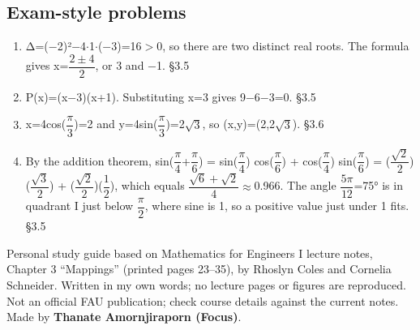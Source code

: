 \documentclass[11pt]{article}
\begin{document}
\begin{keepsection}\subsection{Exam-style problems}

\begin{enumerate}
\item Δ=(\ensuremath{-}2)²\ensuremath{-}4\ensuremath{\cdot}1\ensuremath{\cdot}(\ensuremath{-}3)=16\ensuremath{>}0, so there are two distinct real roots. The formula gives x={\small\ensuremath{\dfrac{2\pm 4}{2}}}, or 3 and \ensuremath{-}1. \hfill{\small\color{FAUblue}§3.5}
\item P(x)=(x\ensuremath{-}3)(x+1). Substituting x=3 gives 9\ensuremath{-}6\ensuremath{-}3=0. \hfill{\small\color{FAUblue}§3.5}
\item x=4cos({\small\ensuremath{\dfrac{π}{3}}})=2 and y=4sin({\small\ensuremath{\dfrac{π}{3}}})=2\ensuremath{\sqrt{3}}, so (x,y)=(2,2\ensuremath{\sqrt{3}}). \hfill{\small\color{FAUblue}§3.6}
\item By the addition theorem, sin({\small\ensuremath{\dfrac{π}{4}}}+{\small\ensuremath{\dfrac{π}{6}}}) = sin({\small\ensuremath{\dfrac{π}{4}}}) cos({\small\ensuremath{\dfrac{π}{6}}}) + cos({\small\ensuremath{\dfrac{π}{4}}}) sin({\small\ensuremath{\dfrac{π}{6}}}) = ({\small\ensuremath{\dfrac{\sqrt{2}}{2}}})({\small\ensuremath{\dfrac{\sqrt{3}}{2}}}) + ({\small\ensuremath{\dfrac{\sqrt{2}}{2}}})({\small\ensuremath{\dfrac{1}{2}}}), which equals {\small\ensuremath{\dfrac{\sqrt{6}+\sqrt{2}}{4}}}\ensuremath{\approx}0.966. The angle {\small\ensuremath{\dfrac{5π}{12}}}=75° is in quadrant I just below {\small\ensuremath{\dfrac{π}{2}}}, where sine is 1, so a positive value just under 1 fits. \hfill{\small\color{FAUblue}§3.5}
\end{enumerate}

\end{keepsection}

\vfill{\small Personal study guide based on Mathematics for Engineers I lecture notes, Chapter 3 “Mappings” (printed pages 23–35), by Rhoslyn Coles and Cornelia Schneider. Written in my own words; no lecture pages or figures are reproduced. Not an official FAU publication; check course details against the current notes. Made by \textbf{Thanate Amornjiraporn (Focus)}.}
\end{document}
